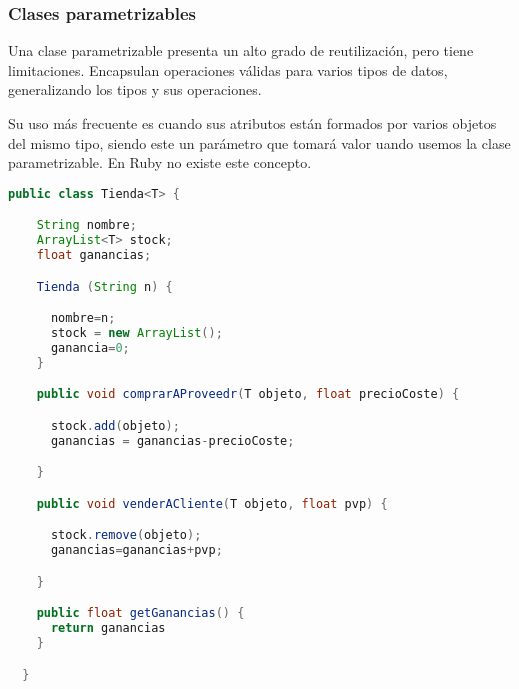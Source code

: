 \documentclass[10pt, a4paper]{article}
\newif\IfInSansMode
\begin{document}
\subsubsection{Clases parametrizables}

Una clase parametrizable presenta un alto grado de reutilización, pero
tiene limitaciones. Encapsulan operaciones válidas para varios tipos de
datos, generalizando los tipos y sus operaciones.

Su uso más frecuente es cuando sus atributos están formados por varios
objetos del mismo tipo, siendo este un parámetro que tomará valor uando
usemos la clase parametrizable. En Ruby no existe este concepto.

\begin{lstlisting}[language=Java] 
public class Tienda<T> {

    String nombre;
    ArrayList<T> stock;
    float ganancias;

    Tienda (String n) {

      nombre=n;
      stock = new ArrayList();
      ganancia=0;
    }

    public void comprarAProveedr(T objeto, float precioCoste) {

      stock.add(objeto);
      ganancias = ganancias-precioCoste;

    }

    public void venderACliente(T objeto, float pvp) {

      stock.remove(objeto);
      ganancias=ganancias+pvp;

    }

    public float getGanancias() {
      return ganancias
    }

  }

\end{lstlisting}

\begin{lstlisting}

\end{lstlisting}

\subsection{}

\subsection{}

\begin{lstlisting}

\end{lstlisting}


\end{document}
